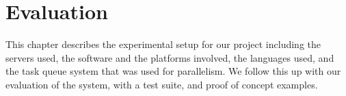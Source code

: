 \section{Evaluation}
This chapter describes the experimental setup for our project including the servers used, the software and the platforms involved, the languages used, and the task queue system that was used for parallelism. We follow this up with our evaluation of the system, with a test suite, and proof of concept examples.






